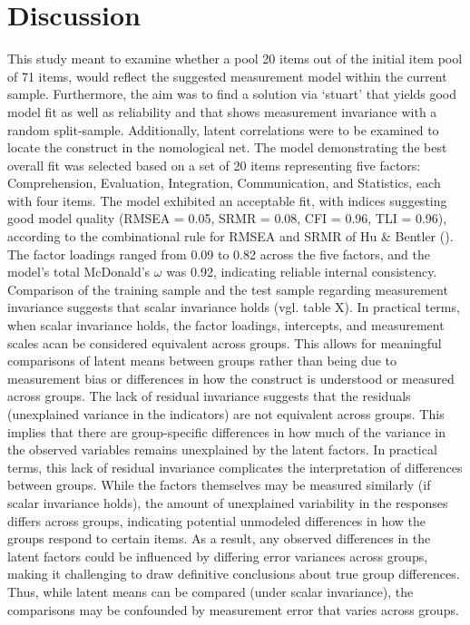 \documentclass[
  12pt,
  a4paper,
  twoside]{article}
\begin{document}
\section{Discussion}\label{discussion}

This study meant to examine whether a pool 20 items out of the initial item pool of 71 items, would reflect the suggested measurement model within the current sample. Furthermore, the aim was to find a solution via `stuart' that yields good model fit as well as reliability and that shows measurement invariance with a random split-sample. Additionally, latent correlations were to be examined to locate the construct in the nomological net.
The model demonstrating the best overall fit was selected based on a set of 20 items representing five factors: Comprehension, Evaluation, Integration, Communication, and Statistics, each with four items. The model exhibited an acceptable fit, with indices suggesting good model quality (RMSEA = 0.05, SRMR = 0.08, CFI = 0.96, TLI = 0.96), according to the combinational rule for RMSEA and SRMR of Hu \& Bentler (). The factor loadings ranged from 0.09 to 0.82 across the five factors, and the model's total McDonald's \(\omega\) was 0.92, indicating reliable internal consistency.
Comparison of the training sample and the test sample regarding measurement invariance suggests that scalar invariance holds (vgl. table X).
In practical terms, when scalar invariance holds, the factor loadings, intercepts, and measurement scales acan be considered equivalent across groups. This allows for meaningful comparisons of latent means between groups rather than being due to measurement bias or differences in how the construct is understood or measured across groups.
The lack of residual invariance suggests that the residuals (unexplained variance in the indicators) are not equivalent across groups. This implies that there are group-specific differences in how much of the variance in the observed variables remains unexplained by the latent factors. In practical terms, this lack of residual invariance complicates the interpretation of differences between groups. While the factors themselves may be measured similarly (if scalar invariance holds), the amount of unexplained variability in the responses differs across groups, indicating potential unmodeled differences in how the groups respond to certain items.
As a result, any observed differences in the latent factors could be influenced by differing error variances across groups, making it challenging to draw definitive conclusions about true group differences. Thus, while latent means can be compared (under scalar invariance), the comparisons may be confounded by measurement error that varies across groups.
\end{document}
